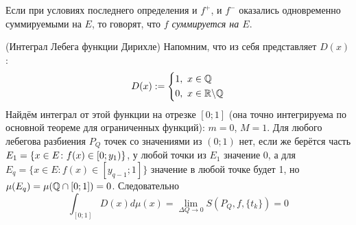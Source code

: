 \begin{definition}
	Если при условиях последнего определения и $f^+$, и $f^-$ оказались одновременно суммируемыми на $E$, то говорят, что \textit{$f$ суммируется на $E$}.
\end{definition}

\begin{example} (Интеграл Лебега функции Дирихле)
	Напомним, что из себя представляет $D(x)$:
	\[
		D(x) := \left\{\begin{aligned}
			&{1,\ x \in \mathbb{Q}}
			\\
			&{0,\ x \in \mathbb{R} \backslash \mathbb{Q}}
		\end{aligned}\right.
	\]
	Найдём интеграл от этой функции на отрезке $[0; 1]$ (она точно интегрируема по основной теореме для ограниченных функций): $m = 0$, $M = 1$. Для любого лебегова разбиения $P_Q$ точек со значениями из $(0; 1)$ нет, если же берётся часть $E_1 = \{x \in E \colon f(x) \in \left[0; y_1\right)\}$, у любой точки из $E_1$ значение 0, а для $E_q = \{x \in E \colon f(x) \in [y_{q - 1}; 1]\}$ значение в любой точке будет 1, но $\mu(E_q) = \mu(\mathbb{Q} \cap [0; 1]) = 0$. Следовательно
	\[
		\int_{[0; 1]} D(x)d\mu(x) = \lim_{\Delta Q \to 0} S(P_Q, f, \{t_k\}) = 0
	\]
\end{example}
